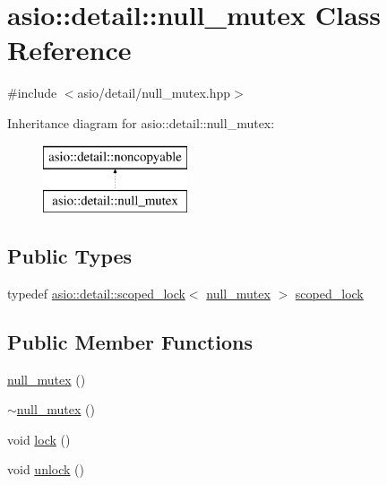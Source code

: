 \hypertarget{classasio_1_1detail_1_1null__mutex}{}\section{asio\+:\+:detail\+:\+:null\+\_\+mutex Class Reference}
\label{classasio_1_1detail_1_1null__mutex}


{\ttfamily \#include $<$asio/detail/null\+\_\+mutex.\+hpp$>$}

Inheritance diagram for asio\+:\+:detail\+:\+:null\+\_\+mutex\+:\begin{figure}[H]
\begin{center}
\leavevmode
\includegraphics[height=2.000000cm]{classasio_1_1detail_1_1null__mutex}
\end{center}
\end{figure}
\subsection*{Public Types}
\begin{DoxyCompactItemize}
\item 
typedef \hyperlink{classasio_1_1detail_1_1scoped__lock}{asio\+::detail\+::scoped\+\_\+lock}$<$ \hyperlink{classasio_1_1detail_1_1null__mutex}{null\+\_\+mutex} $>$ \hyperlink{classasio_1_1detail_1_1null__mutex_a2cee63c1e6051f9c6a361e9b6da8f6f7}{scoped\+\_\+lock}
\end{DoxyCompactItemize}
\subsection*{Public Member Functions}
\begin{DoxyCompactItemize}
\item 
\hyperlink{classasio_1_1detail_1_1null__mutex_a1a0e783cee676626663715d7dd310bf2}{null\+\_\+mutex} ()
\item 
\hyperlink{classasio_1_1detail_1_1null__mutex_a00cfcd33e85458e41b83cbf96713c066}{$\sim$null\+\_\+mutex} ()
\item 
void \hyperlink{classasio_1_1detail_1_1null__mutex_aaccd3af9a4c17678aa29d9c840b81b72}{lock} ()
\item 
void \hyperlink{classasio_1_1detail_1_1null__mutex_aa5658c0da6d8e1a3c11998fdf0e96f22}{unlock} ()
\end{DoxyCompactItemize}


